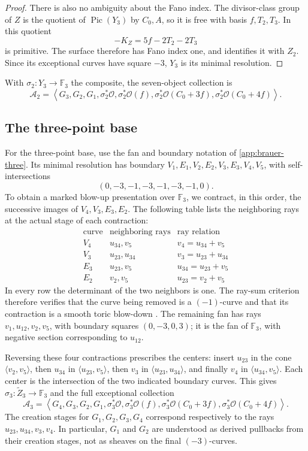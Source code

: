 \documentclass[11pt]{article}
\theoremstyle{plain}
\theoremstyle{definition}
\theoremstyle{remark}
\newcommand{\F}{\mathbb F}
\newcommand{\Pic}{\operatorname{Pic}}
\newcommand{\OO}{\mathcal O}
\begin{document}
\begin{proof}
There is also no ambiguity about the Fano index. The divisor-class group
of \(Z\) is the quotient of \(\Pic(Y_3)\) by \(C_0,A\), so it is
free with basis \(f,T_2,T_3\). In this quotient
\[
-K_Z=5f-2T_2-2T_3
\]
is primitive. The surface therefore has Fano index one, and
\cite[Theorem~4 and Remark~7]{Corti2016} identifies it with \(Z_2\).
Since its exceptional curves have square \(-3\), \(Y_3\) is its
minimal resolution.
\end{proof}

With \(\sigma_2:Y_3\to\F_3\) the composite, the seven-object collection is
\[
\mathscr A_2=\left\langle G_3,G_2,G_1,
\sigma_2^*\OO,\sigma_2^*\OO(f),
\sigma_2^*\OO(C_0+3f),\sigma_2^*\OO(C_0+4f)\right\rangle.
\]

\subsection{The three-point base}
\label{app:explicit-base-three}

For the three-point base, use the fan and boundary notation of
\cref{app:brauer-three}. Its minimal resolution has boundary
\(V_1,E_1,V_2,E_2,V_3,E_3,V_4,V_5\), with self-intersections
\[
(0,-3,-1,-3,-1,-3,-1,0).
\]
To obtain a marked blow-up presentation over \(\F_3\), we contract, in this
order, the successive images of \(V_4,V_3,E_3,E_2\). The following table lists
the neighboring rays at the actual stage of each contraction:
\[
\begin{array}{c|c|c}
\text{curve}&\text{neighboring rays}&\text{ray relation}\\ \hline
V_4&u_{34},v_5&v_4=u_{34}+v_5\\
V_3&u_{23},u_{34}&v_3=u_{23}+u_{34}\\
E_3&u_{23},v_5&u_{34}=u_{23}+v_5\\
E_2&v_2,v_5&u_{23}=v_2+v_5
\end{array}
\]
In every row the determinant of the two neighbors is one. The ray-sum
criterion therefore verifies that the curve being removed is a
\((-1)\)-curve and that its contraction is a smooth toric blow-down
\cite[Theorem~10.4.4]{CoxLittleSchenck2011}. The remaining fan has rays
\(v_1,u_{12},v_2,v_5\), with boundary squares \((0,-3,0,3)\);
it is the fan of \(\F_3\), with negative section corresponding to
\(u_{12}\).

Reversing these four contractions prescribes the centers: insert
\(u_{23}\) in the cone \(\langle v_2,v_5\rangle\), then
\(u_{34}\) in \(\langle u_{23},v_5\rangle\), then \(v_3\) in
\(\langle u_{23},u_{34}\rangle\), and finally \(v_4\) in
\(\langle u_{34},v_5\rangle\). Each center is the intersection of
the two indicated boundary curves. This gives
\(\sigma_3:\widetilde Z_3\to\F_3\) and the full exceptional collection
\[
\mathscr A_3=\left\langle G_4,G_3,G_2,G_1,
\sigma_3^*\OO,\sigma_3^*\OO(f),
\sigma_3^*\OO(C_0+3f),\sigma_3^*\OO(C_0+4f)\right\rangle.
\]
The creation stages for \(G_1,G_2,G_3,G_4\) correspond respectively
to the rays \(u_{23},u_{34},v_3,v_4\). In particular, \(G_1\) and \(G_2\)
are understood as derived pullbacks from their creation stages, not as
sheaves on the final \((-3)\)-curves.
\end{document}
